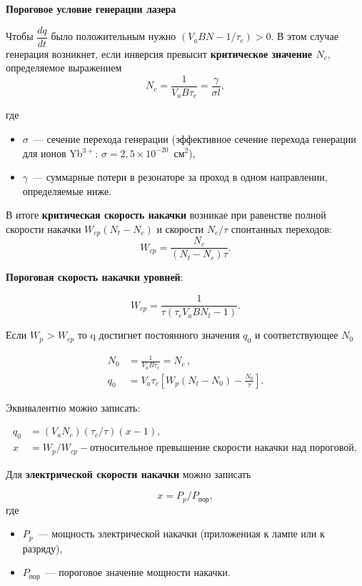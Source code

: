 \documentclass[12pt]{article}
\begin{document}
\textbf{Пороговое условие генерации лазера}

\par

Чтобы $\dfrac{dq}{dt}$ было положительным нужно $(V_a B N - 1/\tau_c) > 0$. В этом случае генерация возникнет, если инверсия превысит \textbf{критическое значение $N_c$}, определяемое выражением
\[
N_c = \frac{1}{V_a B \tau_c} = \frac{\gamma}{\sigma l},\tag{8}
\]

где
\begin{itemize}
    \item $\sigma$~--- сечение перехода генерации (эффективное сечение перехода генерации для ионов Yb${}^{3+}$: $\sigma = 2{,}5 \times 10^{-20}$~см${}^2$),
    \item $\gamma$~--- суммарные потери в резонаторе за проход в одном направлении, определяемые ниже.
\end{itemize}

В итоге \textbf{критическая скорость накачки} возникае при равенстве полной скорости накачки $W_{cp} (N_t - N_c)$ и скорости $N_c/\tau$ спонтанных переходов:
\[
W_{cp} = \frac{N_c}{(N_t - N_c)\tau}.\tag{9}
\]

\textbf{Пороговая скорость накачки уровней}:

\[
W_{cp} = \frac{1}{\tau(\tau_c V_a B N_t - 1)}.\tag{10}
\]

Если $W_{p}$ > $W_{cp}$ то q достигнет постоянного значения $q_{0}$ и соответствующее $N_{0}$ 

\[\tag{11}
\begin{aligned} 
N_0 &= \frac{1}{V_a B \tau_c} = N_c\,, \\[10pt]
q_0 &= V_a \tau_c \left[ W_p (N_t - N_0) - \frac{N_0}{\tau} \right].
\end{aligned}
\]

Эквивалентно можно записать:

\[\tag{12}
\begin{aligned}
q_0 &= (V_a N_c)(\tau_c/\tau)(x - 1), \\[10pt]
x &= W_p / W_{cp} - \text{относительное превышение скорости накачки над пороговой},
\end{aligned}
\]

Для \textbf{электрической скорости накачки} можно записать

\[
x = P_p / P_{\text{пор}},
\]
где
\begin{itemize}
    \item $P_p$~--- мощность электрической накачки (приложенная к лампе или к разряду),
    \item $P_{\text{пор}}$~--- пороговое значение мощности накачки.
\end{itemize}
\end{document}
